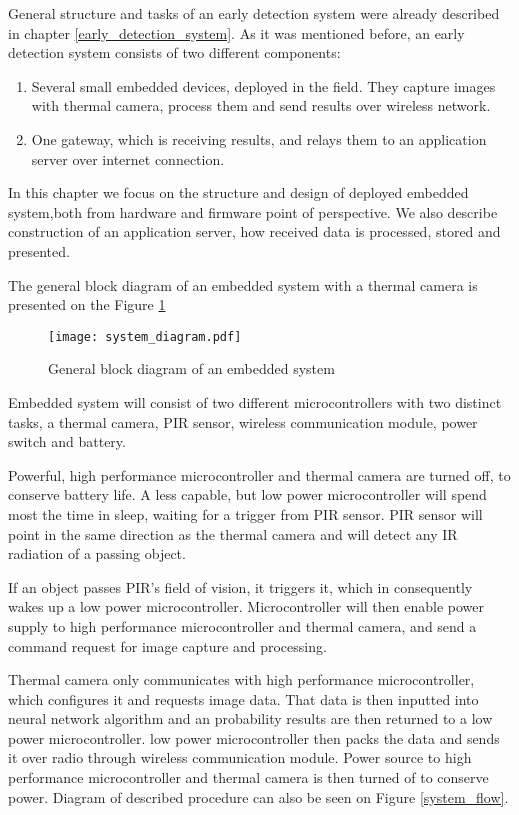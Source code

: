 General structure and tasks of an early detection system were already described in chapter \ref{early_detection_system}.
As it was mentioned before, an early detection system consists of two different components:

\begin{enumerate} 
    \item Several small embedded devices, deployed in the field. They capture images with thermal camera, process them and send results over wireless network.
    \item One gateway, which is receiving results, and relays them to an application server over internet connection.
\end{enumerate} 

In this chapter we focus on the structure and design of deployed embedded system,both from hardware and firmware point of perspective.
We also describe construction of an application server, how received data is processed, stored and presented.

The general block diagram of an embedded system with a thermal camera is presented on the Figure \ref{system_diagram} 

\begin{figure}[ht]
        \centering
        \texttt{[image: system\_diagram.pdf]} 
        \caption{ General block diagram of an embedded system}
        \label{system_diagram}
\end{figure}

Embedded system will consist of two different microcontrollers with two distinct tasks, a thermal camera, PIR sensor, wireless communication module, power switch and battery.

Powerful, high performance microcontroller and thermal camera are turned off, to conserve battery life.
A less capable, but low power microcontroller will spend most the time in sleep, waiting for a trigger from PIR sensor.
PIR sensor will point in the same direction as the thermal camera and will detect any IR radiation of a passing object.

If an object passes PIR's field of vision, it triggers it, which in consequently wakes up a low power microcontroller.
Microcontroller will then enable power supply to high performance microcontroller and thermal camera, and send a command request for image capture and processing.

Thermal camera only communicates with high performance microcontroller, which configures it and requests image data.
That data is then inputted into neural network algorithm and an probability results are then returned to a low power microcontroller.
low power microcontroller then packs the data and sends it over radio through wireless communication module.
Power source to high performance microcontroller and thermal camera is then turned of to conserve power.
Diagram of described procedure can also be seen on Figure \ref{system_flow}.

